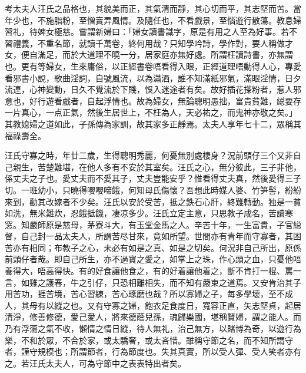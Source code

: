 \documentclass[a5paper, 12pt, openany]{book} %
\makeatletter
\renewcommand\chapter{\if@openright\cleardoublepage\else\clearpage\fi
  \thispagestyle{plain}%
  \global\@topnum\z@
  \@afterindentfalse
  \secdef\@chapter\@schapter}
\makeatother
\begin{document}
	考太夫人汪氏之品格也，其貌美而正，其氣清而靜，其心切而平，其志堅而苦。當年少也，不施脂粉，至憎賣弄風情。及隨任也，不看戲景，至惱遊行散蕩。教息婦習礼，待婢女極慈。嘗謂新婦曰：「婦女讀書識字，原是有用之人至為好事。若不習禮義，不重名節，就讀千萬卷，終何用哉？只知學吟詩，學作對，要人稱做才女，便自滿足，而於大道理不曉一分，居家庭亦無好處。所謂枉讀詩書，亦無謂也。更有等婦女，生來庸俗，以正經書卷唔看得入眼，正經道理唔動得人心，專愛看邪書小說，歌曲淫詞，自號風流，以為瀟洒，誰不知滿紙邪氣，滿眼淫情，日夕流連，心神變動，日久不覺流於下賤，悞入迷途者有矣。故好插花搽粉者，惹人邪意也，好行遊看戲者，自起浮情也。故為婦女，無論聰明愚拙，富貴貧難，縂要存一片真心，一点正氣，然後生居世上，不枉為人，天必祐之，而鬼神亦敬之矣。」其教媳婦之道如此，子孫傳為家訓，故其家多正靜焉。太夫人享年七十二，眾稱其福祿壽全。

	汪氏守寡之時，年廿二歲，生得聰明秀麗，何憂無別處棲身？況前頭仔三个又非自己親生，苦楚難堪，在他人多有不安於其室矣。汪氏之心，無分彼此，三子非他，係丈夫之子也。愛丈夫而不愛其子，丈夫豈能安乎？惟看得丈夫真，然後愛得三子切。一班幼小，只曉得嚶嚶啼餓，何知母氏傷懷？吾想此時媒人婆、竹笋髻，紛紛來到，勸其改嫁者不少矣。汪氏以安於受苦，抵之鉄石心肝，終難轉動。独是一貧如洗，無米難炊，忍餓抵饑，凄凉多少。汪氏立定主意，只思教子成名，苦讀寒窓。知嚴師原是慈母，茅寮斗大，有玉堂金馬之人。辛苦十年，一生富貴，子官縂督，自己封一品太夫人，所謂苦尽甘來，竟如所望。世間亦有青年而守寡者，其困苦亦有相同；布教子之心，未必有如是之真、如是之切矣。何況非自己所出，原係前頭仔者哉。即自己所生，亦不過寶之愛之，如掌上之珠，作心頭之血，只憂他唔養得大，唔高得快。有的好食讓他食之，有的好着讓他着之，斷不肯打一棍、罵一言，如雞之護春，牛之引仔，只恐相離相失，而不知有嚴束之道焉。又安肯治其子用苦功，捱苦境，苦心習練，苦心琢磨也哉？所以寡婦之子，每多學壞，至不成人，其母有以縱之也。又有守寡之婦，飽衣足食度日，寬容正直，矢志堅貞，起居清淨，修善修德，愛己愛人，將來德蔭兒孫，魂歸樂國，堪稱賢婦，謂之能人。而乃有浮蕩之氣不收，懶情之情日縱，待人無礼，治己無方，以賭博為奇，以遊行為樂，不和於眾，不合於家，或太驕奢，或太吝惜。雖稱守節之名，而不知所謂守者，謹守規模也；所謂節者，行為節度也。失其真實，所以受人彈、受人笑者亦有之。若汪氏太夫人，可為守節中之表表特出者矣。

 

 
 

	\printindex %









\end{document}
